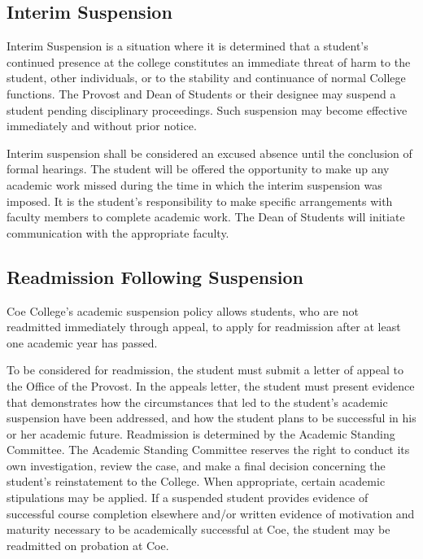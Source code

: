 \documentclass[
  letterpaper,
]{scrbook}
\begin{document}
\subsection{Interim Suspension}\label{sec-interim-suspension}

Interim Suspension is a situation where it is determined that a
student's continued presence at the college constitutes an immediate
threat of harm to the student, other individuals, or to the stability
and continuance of normal College functions. The Provost and Dean of
Students or their designee may suspend a student pending disciplinary
proceedings. Such suspension may become effective immediately and
without prior notice.

Interim suspension shall be considered an excused absence until the
conclusion of formal hearings. The student will be offered the
opportunity to make up any academic work missed during the time in which
the interim suspension was imposed. It is the student's responsibility
to make specific arrangements with faculty members to complete academic
work. The Dean of Students will initiate communication with the
appropriate faculty.

\subsection{Readmission Following
Suspension}\label{sec-readmission-following-suspension}

Coe College's academic suspension policy allows students, who are not
readmitted immediately through appeal, to apply for readmission after at
least one academic year has passed.

To be considered for readmission, the student must submit a letter of
appeal to the Office of the Provost. In the appeals letter, the student
must present evidence that demonstrates how the circumstances that led
to the student's academic suspension have been addressed, and how the
student plans to be successful in his or her academic future.
Readmission is determined by the Academic Standing Committee. The
Academic Standing Committee reserves the right to conduct its own
investigation, review the case, and make a final decision concerning the
student's reinstatement to the College. When appropriate, certain
academic stipulations may be applied. If a suspended student provides
evidence of successful course completion elsewhere and/or written
evidence of motivation and maturity necessary to be academically
successful at Coe, the student may be readmitted on probation at Coe.
\end{document}
